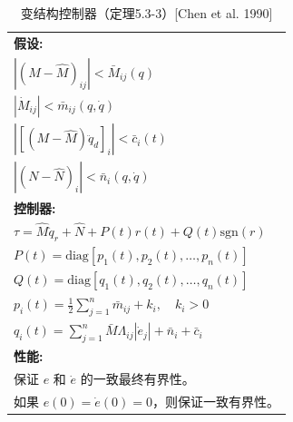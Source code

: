\documentclass[UTF8,12pt,a4paper]{ctexart}
\begin{document}
\begin{table}[htbp]
\centering
\caption{变结构控制器（定理5.3-3）[Chen et al. 1990]}
\label{tab:5.3.3}
\begin{tabular}{@{}l@{}}
\toprule
\textbf{假设:} \\[0.5em]
\quad $|(M - \hat{M})_{ij}| < \bar{M}_{ij}(q)$ \\[0.5em]
\quad $|\dot{M}_{ij}| < \bar{m}_{ij}(q, \dot{q})$ \\[0.5em]
\quad $|[(M - \hat{M})\ddot{q}_d]_i| < \bar{c}_i(t)$ \\[0.5em]
\quad $|(N - \hat{N})_i| < \bar{n}_i(q, \dot{q})$ \\[1em]
\midrule
\textbf{控制器:} \\[0.5em]
\quad $\displaystyle \tau = \hat{M}\ddot{q}_r + \hat{N} + P(t)r(t) + Q(t)\text{sgn}(r)$ \\[0.8em]
\quad $\displaystyle P(t) = \text{diag}[p_1(t), p_2(t), \ldots, p_n(t)]$ \\[0.5em]
\quad $\displaystyle Q(t) = \text{diag}[q_1(t), q_2(t), \ldots, q_n(t)]$ \\[0.8em]
\quad $\displaystyle p_i(t) = \frac{1}{2}\sum_{j=1}^{n}\bar{m}_{ij} + k_i, \quad k_i > 0$ \\[0.8em]
\quad $\displaystyle q_i(t) = \sum_{j=1}^{n}\bar{M}\Lambda_{ij}|\dot{e}_j| + \bar{n}_i + \bar{c}_i$ \\[1em]
\midrule
\textbf{性能:} \\
\quad 保证 $e$ 和 $\dot{e}$ 的一致最终有界性。 \\
\quad 如果 $e(0) = \dot{e}(0) = 0$，则保证一致有界性。 \\
\bottomrule
\end{tabular}
\end{table}
\end{document}
